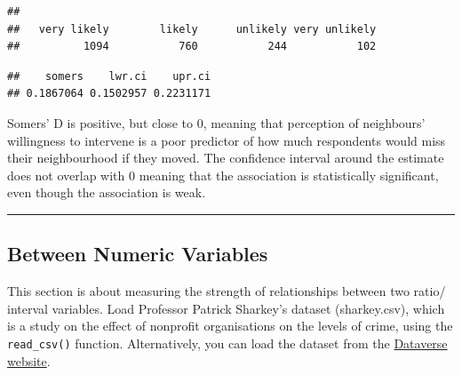 \documentclass[
]{book}
\newenvironment{Shaded}{\begin{snugshade}}{\end{snugshade}}
\newcommand{\AttributeTok}[1]{\textcolor[rgb]{0.77,0.63,0.00}{#1}}
\newcommand{\CommentTok}[1]{\textcolor[rgb]{0.56,0.35,0.01}{\textit{#1}}}
\newcommand{\FloatTok}[1]{\textcolor[rgb]{0.00,0.00,0.81}{#1}}
\newcommand{\FunctionTok}[1]{\textcolor[rgb]{0.00,0.00,0.00}{#1}}
\newcommand{\NormalTok}[1]{#1}
\newcommand{\OtherTok}[1]{\textcolor[rgb]{0.56,0.35,0.01}{#1}}
\newcommand{\SpecialCharTok}[1]{\textcolor[rgb]{0.00,0.00,0.00}{#1}}
\newcommand{\StringTok}[1]{\textcolor[rgb]{0.31,0.60,0.02}{#1}}
\begin{document}
\begin{verbatim}
## 
##   very likely        likely      unlikely very unlikely 
##          1094           760           244           102
\end{verbatim}

\begin{Shaded}
\end{Shaded}

\begin{verbatim}
##    somers    lwr.ci    upr.ci 
## 0.1867064 0.1502957 0.2231171
\end{verbatim}

Somers' D is positive, but close to 0, meaning that perception of neighbours' willingness to intervene is a poor predictor of how much respondents would miss their neighbourhood if they moved. The confidence interval around the estimate does not overlap with 0 meaning that the association is statistically significant, even though the association is weak.

\begin{center}\rule{0.5\linewidth}{0.5pt}\end{center}

\hypertarget{between-numeric-variables}{%
\subsection{Between Numeric Variables}\label{between-numeric-variables}}

This section is about measuring the strength of relationships between two ratio/ interval variables. Load Professor Patrick Sharkey's dataset (sharkey.csv), which is a study on the effect of nonprofit organisations on the levels of crime, using the \texttt{read\_csv()} function. Alternatively, you can load the dataset from the \href{https://dataverse.harvard.edu/dataset.xhtml?persistentId=doi:10.7910/DVN/46WIH0}{Dataverse website}.
\end{document}
